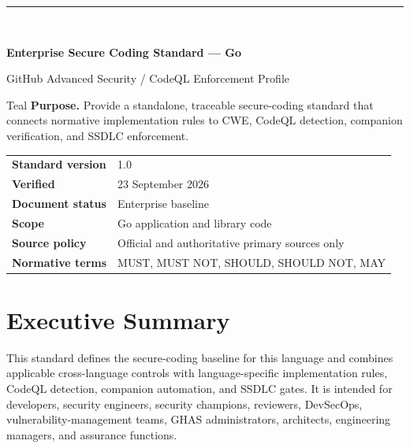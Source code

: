 \documentclass[10pt,letterpaper]{article}
\begin{document}
\fancyhead[L]{\textcolor{Muted}{Enterprise Secure Coding Standard --- Go}}
\fancyhead[R]{\textcolor{Muted}{v1.0 --- 23 September 2026}}
\hypersetup{pageanchor=false}
\begin{titlepage}
\thispagestyle{empty}
\vspace*{0.85in}
{\color{Teal}\rule{1.2in}{3pt}}\\[0.32in]
{\Huge\bfseries\color{Navy}Enterprise Secure Coding Standard --- Go\par}
\vspace{0.18in}
{\Large\color{Teal}GitHub Advanced Security / CodeQL Enforcement Profile\par}
\vspace{0.55in}
\begin{callout}{Teal}
\textbf{Purpose.} Provide a standalone, traceable secure-coding standard that connects normative implementation rules to CWE, CodeQL detection, companion verification, and SSDLC enforcement.
\end{callout}
\vfill
\begin{tabular}{@{}ll@{}}
\textbf{Standard version} & 1.0 \\
\textbf{Verified} & 23 September 2026 \\
\textbf{Document status} & Enterprise baseline \\
\textbf{Scope} & Go application and library code \\
\textbf{Source policy} & Official and authoritative primary sources only \\
\textbf{Normative terms} & MUST, MUST NOT, SHOULD, SHOULD NOT, MAY \\
\end{tabular}
\vspace{0.55in}
\end{titlepage}
\hypersetup{pageanchor=true}
\tableofcontents
\clearpage
{}

\section{Executive Summary}
This standard defines the secure-coding baseline for this language and combines applicable cross-language controls with language-specific implementation rules, CodeQL detection, companion automation, and SSDLC gates. It is intended for developers, security engineers, security champions, reviewers, DevSecOps, vulnerability-management teams, GHAS administrators, architects, engineering managers, and assurance functions.
\end{document}
